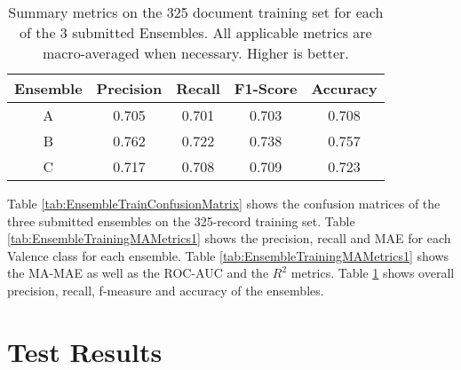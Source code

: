 \begin{table}
\centering
    \begin{tabular}{|c|c|c|c|c|}

         \hline
         \textsf{ Ensemble } & \textsf{ Precision } & \textsf{ Recall } & \textsf{ F1-Score } & \textsf{ Accuracy } \\ 
         \hline
         \textsf{ \cellcolor{gray!15} A } & 0.705 & 0.701 & 0.703 & 0.708 \\
         \textsf{ \cellcolor{gray!15} B } & \cellcolor{gray!15} 0.762 & \cellcolor{gray!15} 0.722 & \cellcolor{gray!15} 0.738 & \cellcolor{gray!15} 0.757 \\ 
         \textsf{ \cellcolor{gray!15} C } & 0.717 & 0.708 & 0.709 & 0.723 \\ 
         \hline
    \end{tabular}
    \caption{Summary metrics on the 325 document training set for each of the 3 submitted Ensembles. All applicable metrics are macro-averaged when necessary. Higher is better.}
    \label{tab:EnsembleTrainingMAMetrics2}
\end{table}

Table \ref{tab:EnsembleTrainConfusionMatrix} shows
the confusion matrices of the three submitted ensembles
on the 325-record training set. Table \ref{tab:EnsembleTrainingMAMetrics1}
shows the precision, recall and \textsf{MAE} for each \textsf{Valence}
class for each ensemble.  Table \ref{tab:EnsembleTrainingMAMetrics1}
shows the \textsf{MA-MAE} as well as the ROC-AUC and the \textsf{$R^2$}
metrics. Table \ref{tab:EnsembleTrainingMAMetrics2} shows overall
precision, recall, f-measure and accuracy of the ensembles.





\section{Test Results}



